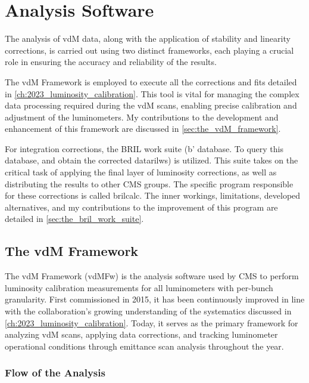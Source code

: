 \chapter{Analysis Software}

The analysis of vdM data, along with the application of stability and linearity corrections, is carried out using two distinct frameworks, each playing a crucial role in ensuring the accuracy and reliability of the results.

The vdM Framework \cite{VdMFramework} is employed to execute all the corrections and fits detailed in \autoref{ch:2023_luminosity_calibration}. This tool is vital for managing the complex data processing required during the vdM scans, enabling precise calibration and adjustment of the luminometers. My contributions to the development and enhancement of this framework are discussed in \autoref{sec:the_vdM_framework}.

For integration corrections, the BRIL work suite (b' database. To query this database, and obtain the corrected datarilws) \cite{xie_bril} is utilized. This suite takes on the critical task of applying the final layer of luminosity corrections, as well as distributing the results to other CMS groups. The specific program responsible for these corrections is called brilcalc. The inner workings, limitations, developed alternatives, and my contributions to the improvement of this program are detailed in \autoref{sec:the_bril_work_suite}.

\section{The vdM Framework}
\label{sec:the_vdM_framework}

The vdM Framework (vdMFw) is the analysis software used by CMS to perform luminosity calibration measurements for all luminometers with per-bunch granularity. First commissioned in 2015, it has been continuously improved in line with the collaboration’s growing understanding of the systematics discussed in \autoref{ch:2023_luminosity_calibration}. Today, it serves as the primary framework for analyzing vdM scans, applying data corrections, and tracking luminometer operational conditions through emittance scan analysis throughout the year.

\subsection{Flow of the Analysis}

